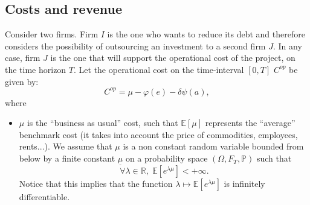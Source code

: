\documentclass{svjour3}
\begin{document}
\subsection{Costs and revenue}

Consider two firms. Firm $I$ is the one who wants to reduce its debt and therefore considers the possibility of outsourcing an investment to a second firm $J$. In any case, firm $J$ is the one that will support the operational cost of the project, on the time horizon $T$. Let  the operational cost on the time-interval $[0,T]$ $C^{op}$ be given by:
 \begin{equation}
 \label{EqOperationalCost}
 C^{op}=\mu-\varphi(e)-\delta \psi(a),
 \end{equation}
where
\begin{itemize}
\item $\mu$ is the ``business as usual'' cost, such that $\mathbb{E}[ \mu]$ represents the ``average'' benchmark cost (it takes into account the price of commodities, employees, rents...). We assume that $\mu$ is a non constant random variable bounded from below by a finite constant $\underline{\mu}$ on a probability space $(\Omega, F_T,{\mathbb{P}})$
such that
\begin{equation}
\label{hypmu}
\forall \lambda\in\mathbb{R},\;\mathbb{E}\left[e^{\lambda \mu}\right]<+\infty.
\end{equation}
Notice that this implies that the function $\lambda\mapsto \mathbb{E}\left[e^{\lambda \mu}\right]$ is infinitely differentiable.


\end{itemize}
\end{document}
